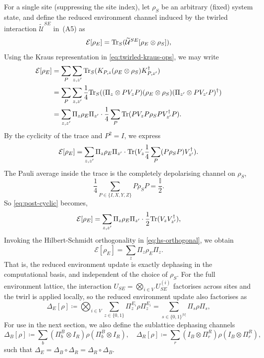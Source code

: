 For a single site (suppressing the site index), let \(\rho_S\) be an arbitrary (fixed) system state, and define the reduced environment channel induced by the twirled interaction \(\widetilde{\mathcal{U}}^{SE}\) in~(A5) as
\begin{equation}\label{eq:system-partial-trace}
    \mathcal{E}[\rho_E] = \mathrm{Tr}_S(\widetilde{\mathcal{U}}^{SE}[\rho_E \otimes \rho_S]),
\end{equation}
Using the Kraus representation in \cref{eq:twirled-kraus-ops}, we may write
\begin{equation}
    \begin{split}
        \mathcal{E}[\rho_E] 
        &= \sum_P \sum_{z,z'} \mathrm{Tr}_S(K_{P, z} (\rho_E \otimes \rho_S) K_{P, z'}^\dagger) \\
        &= \sum_P \sum_{z,z'} \frac{1}{4} \mathrm{Tr}_S((\Pi_z \otimes PV_zP) (\rho_E \otimes \rho_S) (\Pi_{z'} \otimes PV_{z'}P)^\dagger) \\
        &= \sum_{z,z'} \Pi_z \rho_E \Pi_{z'} \cdot \frac{1}{4} \sum_P \mathrm{Tr}(P V_z P \rho_S P V_{z'}^\dagger P).
    \end{split}
\end{equation}
By the cyclicity of the trace and \(P^2 = I\), we express
\begin{equation}\label{eq:post-cyclic}
    \mathcal{E}[\rho_E] = \sum_{z,z'} \Pi_z \rho_E \Pi_{z'} \cdot \mathrm{Tr}(V_z \frac{1}{4}\sum_P(P \rho_S P) V_{z'}^\dagger).
\end{equation}
The Pauli average inside the trace is the completely depolarising channel on \(\rho_S\),
\begin{equation}
    \frac{1}{4}\sum_{P \in \{I,X,Y,Z\}} P \rho_S P = \frac{\mathbb{I}}{2}.
\end{equation}
So \cref{eq:post-cyclic} becomes,
\begin{equation}
    \mathcal{E}[\rho_E] = \sum_{z,z'} \Pi_z \rho_E \Pi_{z'} \cdot \frac{1}{2} \mathrm{Tr}(V_z V_{z'}^\dagger),
\end{equation}
Invoking the Hilbert-Schmidt orthogonality in \cref{eq:hs-orthogonal}, we obtain
\begin{equation}
    \mathcal{E}[\rho_E] = \sum_z \Pi_z \rho_E \Pi_z.
\end{equation}
That is, the reduced environment update is exactly dephasing in the computational basis, and independent of the choice of \(\rho_S\). For the full environment lattice, the interaction \(U_{SE} = \bigotimes_{i\in V} U_{SE}^{(i)}\) factorises across sites and the twirl is applied locally, so the reduced environment update also factorises as
\begin{equation}
    \Delta_E[\rho] 
    \coloneq \bigotimes_{i\in V} \sum_{z\in\{0,1\}} \Pi_z^{E_i} \rho \Pi_z^{E_i}
    = \sum_{s \in \{0,1\}^{|V|}} \Pi_s \rho \Pi_s,
\end{equation}
For use in the next section, we also define the sublattice dephasing channels
\begin{equation}
    \Delta_B[\rho] \coloneq \sum_b(\Pi_b^B \otimes I_R) \rho (\Pi_b^B \otimes I_R), \quad
    \Delta_R[\rho] \coloneq \sum_r(I_B \otimes \Pi_r^R) \rho (I_B \otimes \Pi_r^R),
\end{equation}
such that \(\Delta_E = \Delta_B \circ \Delta_R = \Delta_R \circ \Delta_B\).

